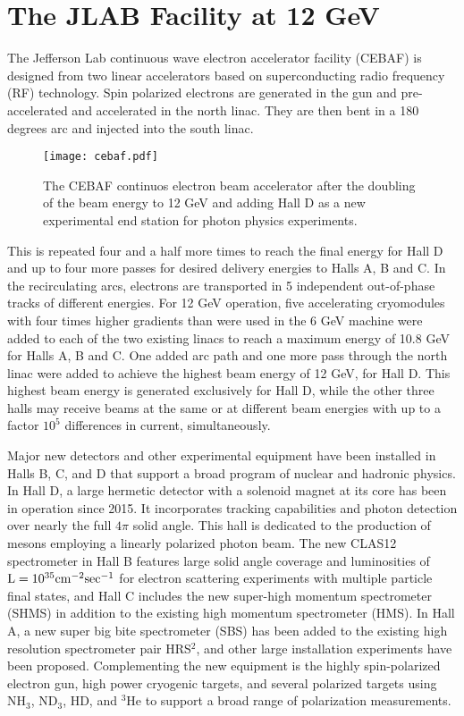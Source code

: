 \section{The JLAB Facility at 12 GeV}
\label{jlab}

\noindent The Jefferson Lab continuous wave electron accelerator facility (CEBAF) is designed from
two linear accelerators based
on superconducting radio frequency (RF) technology. Spin polarized electrons are generated in the gun
and pre-accelerated and accelerated in the north linac. They are then bent in a 180 degrees arc and injected
into the south linac.

\begin{figure}[h]
\texttt{[image: cebaf.pdf]}
\caption{The CEBAF continuos electron beam accelerator after the doubling of the beam energy to 12 GeV and
adding Hall D as a new experimental end station for photon physics experiments. }
\end{figure}
This is repeated four and a half more times to reach the final energy for Hall D and up to four more passes
for desired delivery energies to Halls A, B and C. In the recirculating arcs, electrons are transported in 5
independent out-of-phase tracks of different energies. For 12 GeV operation, five accelerating cryomodules
with four times higher gradients than were used in the 6 GeV machine were added to each of the two
existing linacs to reach a maximum energy of 10.8 GeV for Halls A, B and C. One added arc path and one
more pass through the north linac were added to achieve the highest beam energy of 12 GeV, for Hall D.
This highest beam energy is generated exclusively for Hall D, while the other three halls may receive
beams at the same or at different beam energies with up to a factor $10^5$ differences in current, simultaneously.

Major new detectors and other experimental equipment have been installed in Halls B, C, and D
that support a broad program of nuclear and hadronic physics. In Hall D, a large hermetic detector
with a solenoid magnet at its core has been in operation since 2015. It incorporates tracking
capabilities and photon detection over nearly the full $4\pi$
solid angle. This hall is dedicated to the production of mesons employing a linearly polarized
photon beam. The new CLAS12 spectrometer in Hall B features large solid angle coverage
and luminosities of $\rm {L=10^{35}cm^{-2}sec^{-1}}$ for electron scattering experiments
with multiple particle final states, and Hall C includes the new super-high momentum
spectrometer (SHMS) in addition to the existing high momentum spectrometer (HMS).
In Hall A, a new super big bite spectrometer (SBS) has been added to the existing high resolution
spectrometer pair HRS$^2$, and other large installation experiments have been proposed.
Complementing the new equipment is the highly spin-polarized electron
gun, high power cryogenic targets, and several polarized targets using  NH$_3$, ND$_3$, HD,
and $^3$He to support a broad range of polarization measurements.

